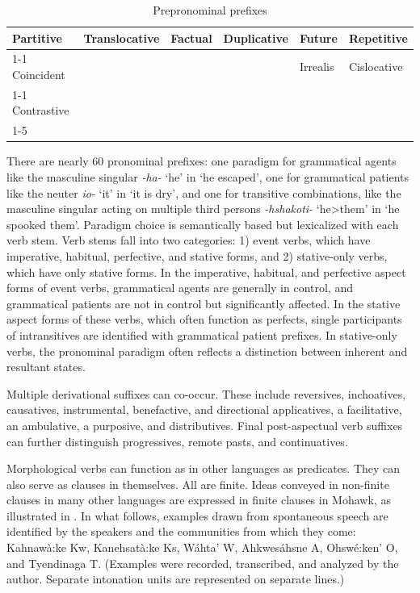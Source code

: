 \documentclass[output=paper,colorlinks,citecolor=brown]{langscibook}
\begin{document}
\begin{table}
\begin{tabular}{|lllll|l|}
\hline
 {Partitive} & \multicolumn{1}{|l|}{Translocative} & \multicolumn{1}{l|}{Factual} &  \multicolumn{1}{l|}{Duplicative} &   {Future} & Repetitive\\
\cline{1-1}\cline{5-6}
 {Coincident} & \multicolumn{1}{|l|}{} & \multicolumn{1}{l|}{} & \multicolumn{1}{l|}{} & \multicolumn{1}{l|}{Irrealis} & Cislocative\\
\cline{1-1}
{Contrastive} & \multicolumn{1}{|l|}{} & \multicolumn{1}{l|}{} & \multicolumn{1}{l|}{} & \multicolumn{1}{l|}{} & \\
\cline{1-5}
\multicolumn{5}{|c|}{Negative} & \\
\hline
\end{tabular}
\caption{Prepronominal prefixes}
\label{tab:moh:2}
\end{table} 

There  are nearly 60 pronominal prefixes: one paradigm for grammatical agents like the masculine singular \textit{{}-ha-} ‘he’ in  ‘he escaped’, one for grammatical patients like the neuter \textit{io-} ‘it’ in  ‘it is dry’,  and one for transitive combinations, like the masculine singular acting on multiple third persons \textit{{}-hshakoti-} ‘he>them’ in  ‘he spooked them’. Paradigm choice is semantically based but lexicalized with each verb stem. Verb stems fall into two categories: 1) event verbs, which have imperative, habitual, perfective, and stative forms, and 2) stative-only verbs, which have only stative forms. In the imperative, habitual, and perfective aspect forms of event verbs, grammatical agents are generally in control, and grammatical patients are not in control but significantly affected. In the stative aspect forms of these verbs, which often function as perfects, single participants of intransitives are identified with grammatical patient prefixes. In stative-only verbs, the pronominal paradigm often reflects a distinction between inherent and resultant states.

Multiple derivational suffixes can co-occur. These include reversives, inchoatives, causatives, instrumental, benefactive, and directional applicatives, a facilitative, an ambulative, a purposive, and distributives. Final post-aspectual verb suffixes can further distinguish progressives, remote pasts, and continuatives.

Morphological verbs can function as in other languages as predicates. They can also serve as clauses in themselves. All are finite. Ideas conveyed in non-finite clauses in many other languages are expressed in finite clauses in Mohawk, as illustrated in . In what follows, examples drawn from spontaneous speech are identified by the speakers and the communities from which they come: Kahnawà:ke Kw, Kanehsatà:ke Ks, Wáhta’ W, Ahkwesáhsne A, Ohswé:ken’ O, and Tyendinaga T. (Examples were recorded, transcribed, and analyzed by the author. Separate intonation units are represented on separate lines.)%
\end{document}
